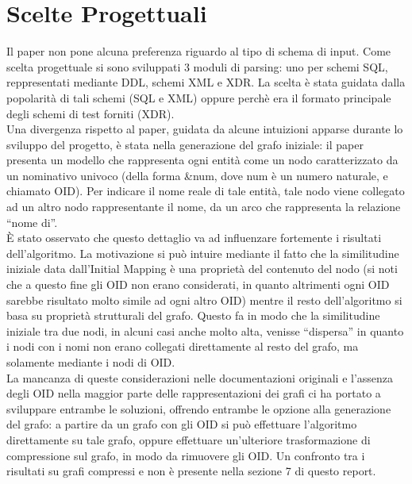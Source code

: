 \documentclass{article}
\begin{document}

\section{Scelte Progettuali}
\label{Scelte Progettuali}

Il paper non pone alcuna preferenza riguardo al tipo di schema di input. Come scelta progettuale si sono sviluppati 3 moduli di parsing: uno per schemi SQL, reppresentati mediante DDL, schemi XML e XDR. La scelta è stata guidata dalla popolarità di tali schemi (SQL e XML) oppure perchè era il formato principale degli schemi di test forniti (XDR).\\

Una divergenza rispetto al paper, guidata da alcune intuizioni apparse durante lo sviluppo del progetto, è stata nella generazione del grafo iniziale: il paper presenta un modello che rappresenta ogni entità come un nodo caratterizzato da un nominativo univoco (della forma \&num, dove num è un numero naturale, e chiamato OID). Per indicare il nome reale di tale entità, tale nodo viene collegato ad un altro nodo rappresentante il nome, da un arco che rappresenta la relazione “nome di”. \\

È stato osservato che questo dettaglio va ad influenzare fortemente i risultati dell’algoritmo. La motivazione si può intuire mediante il fatto che la similitudine iniziale data dall’Initial Mapping è una proprietà del contenuto del nodo (si noti che a questo fine gli OID non erano considerati, in quanto altrimenti ogni OID sarebbe risultato molto simile ad ogni altro OID) mentre il resto dell’algoritmo si basa su proprietà strutturali del grafo. Questo fa in modo che la similitudine iniziale tra due nodi, in alcuni casi anche molto alta, venisse “dispersa” in quanto i nodi con i nomi non erano collegati direttamente al resto del grafo, ma solamente mediante i nodi di OID.\\

La mancanza di queste considerazioni nelle documentazioni originali e l'assenza degli OID nella maggior parte delle rappresentazioni dei grafi ci ha portato a sviluppare entrambe le soluzioni, offrendo entrambe le opzione alla generazione del grafo: a partire da un grafo con gli OID si può effettuare l’algoritmo direttamente su tale grafo, oppure effettuare un’ulteriore trasformazione di compressione sul grafo, in modo da rimuovere gli OID. Un confronto tra i risultati su grafi compressi e non è presente nella sezione 7 di questo report.\\
\end{document}
